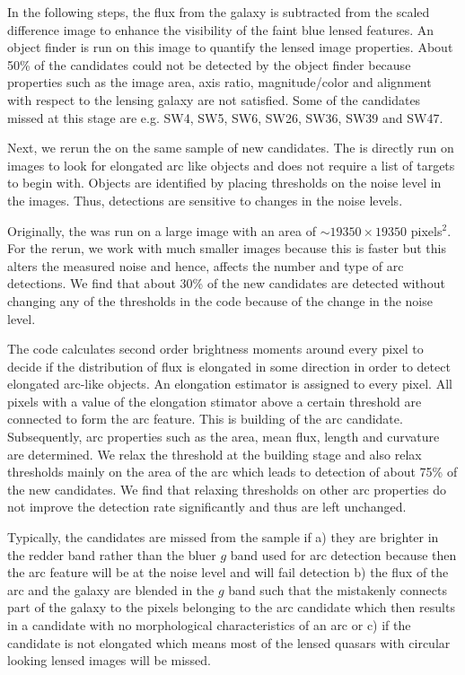 \documentclass[useAMS,usenatbib,a4paper]{mn2e}
\begin{document}
In the following steps, the flux from the galaxy is subtracted from the
scaled difference image to enhance the visibility of the faint blue
lensed features. An object finder is run on this image to quantify the
lensed image properties. About 50\% of the \sw candidates could not be
detected by the object finder because properties such as the image area,
axis ratio, magnitude/color and alignment with respect to the lensing
galaxy are not satisfied. Some of the candidates missed at this stage
are e.g. SW4, SW5, SW6, SW26, SW36, SW39 and SW47.


Next, we rerun the \af on the same \sw sample of new candidates. The \af
is directly run on images to look for elongated arc like objects and does
not require a list of targets to begin with. Objects are identified by
placing thresholds on the noise level in the images. Thus, \af
detections are sensitive to changes in the noise levels.

Originally, the \af was run on a large image with an area of $\sim 19350
\times 19350$ pixels$^2$. For the rerun, we work with much smaller
images because this is faster but this alters the measured
noise and hence, affects the number and type of arc detections. We find
that about 30\% of the new candidates are detected without changing any
of the thresholds in the code because of the change in the noise level.

The \af code calculates second order brightness moments around every
pixel to decide if the distribution of flux is elongated in some
direction in order to detect elongated arc-like objects. An elongation
estimator is assigned to every pixel. All pixels with a value of the
elongation stimator above a certain threshold are connected to form the arc
feature. This is building of the arc candidate. Subsequently, arc
properties such as the area, mean flux, length and curvature are
determined. We relax the threshold at the building stage and also relax
thresholds mainly on the area of the arc which leads to detection of
about 75\% of the new \sw candidates. We find that relaxing thresholds
on other arc properties do not improve the detection rate significantly
and thus are left unchanged.

Typically, the candidates are missed from the \af sample if a) they are
brighter in the redder band rather than the bluer $g$ band used for arc
detection because then the arc feature will be at the noise level and
will fail detection b) the flux of the arc and the galaxy are
blended in the $g$ band such that the \af mistakenly connects part of the
galaxy to the pixels belonging to the arc candidate which then results in a
candidate with no morphological characteristics of an arc or c) if the
candidate is not elongated which means most of the lensed quasars with
circular looking lensed images will be missed.
\end{document}
